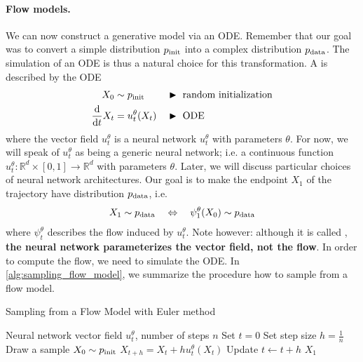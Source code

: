 \paragraph{Flow models.} We can now construct a generative model via an ODE. Remember that our goal was to convert a simple distribution $p_{\rm{init}}$ into a complex distribution $p_{\rm{data}}$. The simulation of an ODE is thus a natural choice for this transformation. A  is described by the ODE
\begin{align*}
    X_0 &\sim p_{\rm{init}}  &&\blacktriangleright\,\,\text{random initialization} \\
    \frac{\mathrm{d}}{\mathrm{d} t}X_t &= u_t^\theta(X_t) &&\blacktriangleright\,\,\text{ODE}
\end{align*}
where the vector field $u_t^\theta$ is a neural network $u_t^\theta$ with parameters $\theta$. For now, we will speak of $u_t^\theta$ as being a generic neural network; i.e. a continuous function $u_t^\theta:\mathbb{R}^d\times [0,1]\to\mathbb{R}^d$ with parameters $\theta$. Later, we will discuss particular choices of neural network architectures. Our goal is to make the endpoint  $X_1$ of the trajectory have distribution $p_{\rm{data}}$, i.e.
\begin{align*}
    X_1 \sim p_{\rm{data}} \quad \Leftrightarrow \quad \psi_1^\theta(X_0)\sim p_{\rm{data}}
\end{align*}
where $\psi_t^\theta$ describes the flow induced by $u_t^\theta$. Note however: although it is called , \textbf{the neural network parameterizes the vector field, not the flow}. In order to compute the flow, we need to simulate the ODE. In \cref{alg:sampling_flow_model}, we summarize the procedure how to sample from a flow model.

\begin{algorithm}[h]
\caption{Sampling from a Flow Model with Euler method}
\label{alg:sampling_flow_model}
\begin{algorithmic}[1]
\REQUIRE Neural network vector field $u_t^\theta$, number of steps $n$
\STATE Set $t=0$
\STATE Set step size $h=\frac{1}{n}$
\STATE Draw a sample $X_0\sim p_{\rm{init}}$
    \STATE $X_{t+h} = X_{t} + h u_t^\theta(X_t)$
    \STATE Update $t\leftarrow t+h$
\ENDFOR
\RETURN $X_1$
\end{algorithmic}
\end{algorithm}

